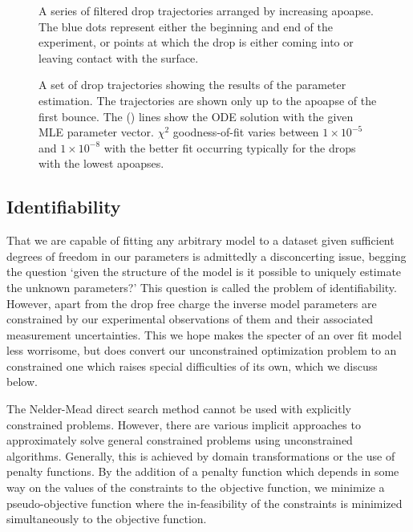 \documentclass[12pt,a4paper,oneside]{book}
\begin{document}
\begin{figure}[h]
    \centering
    \resizebox{\textwidth}{!}{}
    \caption{A series of filtered drop trajectories arranged by increasing apoapse. The blue dots represent either the beginning and end of the experiment, or points at which the drop is either coming into or leaving contact with the surface.}
    \label{fig:trajectories}
\end{figure}
\begin{figure}[h]
    \centering
    \resizebox{\textwidth}{!}{}
    \caption{A set of drop trajectories showing the results of the parameter estimation. The trajectories are shown only up to the apoapse of the first bounce. The (\protect\redline) \hspace{0.25 mm} lines show the ODE solution with the given MLE parameter vector. $\chi^2$ goodness-of-fit varies between $1 \times 10^{-5}$ and $1 \times 10^{-8}$ with the better fit occurring typically for the drops with the lowest apoapses.}
    \label{fig:inverse_problem}
\end{figure}

\subsection{Identifiability}
That we are capable of fitting any arbitrary model to a dataset given sufficient degrees of freedom in our parameters is admittedly a disconcerting issue, begging the question `given the structure of the model is it possible to uniquely estimate the unknown parameters?' This question is called the problem of identifiability. However, apart from the drop free charge the inverse model parameters are constrained by our experimental observations of them and their associated measurement uncertainties. This we hope makes the specter of an over fit model less worrisome, but does convert our unconstrained optimization problem to an constrained one which raises special difficulties of its own, which we discuss below. 

The Nelder-Mead direct search method cannot be used with explicitly constrained problems. However, there are various implicit approaches to approximately solve general constrained problems using unconstrained algorithms. Generally, this is achieved by domain transformations or the use of penalty functions.  By the addition of a penalty function which depends in some way on the values of the constraints to the objective function, we minimize a pseudo-objective function where the in-feasibility of the constraints is minimized simultaneously to the objective function. 
\end{document}
